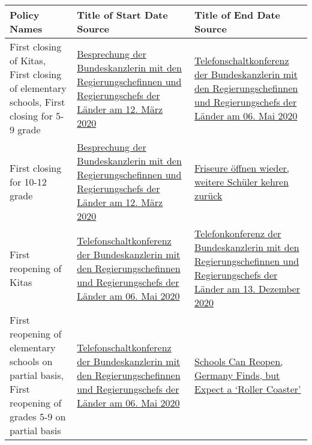 \begin{table}[hbt!]
\centering
{
 \begin{tabular}{|| L | L | L ||}
 \hline
 \bf{Policy Names} &  \bf{Title of Start Date Source} &  \bf{Title of End Date Source} \\ [0.5ex]
 \hline\hline
First closing of Kitas, First closing of elementary schools, First closing for 5-9 grade & \href{https://www.bundesregierung.de/breg-de/themen/coronavirus/beschluss-zu-corona-1730292}{Besprechung der Bundeskanzlerin mit den Regierungschefinnen und Regierungschefs der Länder am 12. März 2020}  & \href{https://www.bundesregierung.de/breg-de/suche/telefonschaltkonferenz-der-bundeskanzlerin-mit-den-regierungschefinnen-und-regierungschefs-der-laender-am-06-mai-2020-1750988}{Telefonschaltkonferenz der Bundeskanzlerin mit den Regierungschefinnen und Regierungschefs der Länder
am 06. Mai 2020}\\

First closing for 10-12 grade & \href{https://www.bundesregierung.de/breg-de/themen/coronavirus/beschluss-zu-corona-1730292}{Besprechung der Bundeskanzlerin mit den Regierungschefinnen und Regierungschefs der Länder am 12. März 2020} & \href{https://www.bundesregierung.de/breg-de/suche/weitere-oeffnungen-1750154}{Friseure öffnen wieder, weitere Schüler kehren zurück} \\

First reopening of Kitas  & \href{https://www.bundesregierung.de/breg-de/suche/telefonschaltkonferenz-der-bundeskanzlerin-mit-den-regierungschefinnen-und-regierungschefs-der-laender-am-06-mai-2020-1750988}{Telefonschaltkonferenz der Bundeskanzlerin mit den Regierungschefinnen und Regierungschefs der Länder
am 06. Mai 2020} & \href{https://www.bundesregierung.de/breg-de/suche/telefonkonferenz-der-bundeskanzlerin-mit-den-regierungschefinnen-und-regierungschefs-der-laender-am-13-dezember-2020-1827392}{Telefonkonferenz der Bundeskanzlerin mit den Regierungschefinnen und Regierungschefs der Länder am 13. Dezember 2020}  \\

 First reopening of elementary schools on partial basis, First reopening of grades 5-9 on partial basis & \href{https://www.bundesregierung.de/breg-de/suche/telefonschaltkonferenz-der-bundeskanzlerin-mit-den-regierungschefinnen-und-regierungschefs-der-laender-am-06-mai-2020-1750988}{Telefonschaltkonferenz der Bundeskanzlerin mit den Regierungschefinnen und Regierungschefs der Länder am 06. Mai 2020} & \href{https://www.nytimes.com/2020/08/26/world/europe/germany-schools-virus-reopening.html}{Schools Can Reopen, Germany Finds, but Expect a ‘Roller Coaster’}  \\


\end{tabular}}
\end{table}
